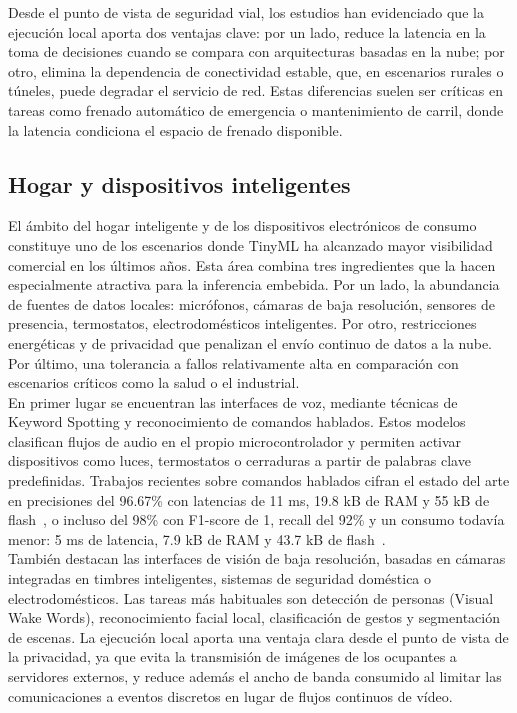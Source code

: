 \documentclass[a4paper,12pt,twoside,final]{book}
\begin{document}
Desde el punto de vista de seguridad vial, los estudios han evidenciado que la ejecución local aporta dos ventajas
clave: por un lado, reduce la latencia en la toma de decisiones cuando se compara con arquitecturas basadas en la
nube; por otro, elimina la dependencia de conectividad estable, que, en escenarios rurales o túneles, puede degradar
el servicio de red. Estas diferencias suelen ser críticas en tareas como frenado automático de emergencia
o mantenimiento de carril, donde la latencia condiciona el espacio de frenado disponible.

\subsection{Hogar y dispositivos inteligentes}
El ámbito del hogar inteligente y de los dispositivos electrónicos de consumo constituye uno de los escenarios donde
TinyML ha alcanzado mayor visibilidad comercial en los últimos años. Esta área combina tres ingredientes que la
hacen especialmente atractiva para la inferencia embebida. Por un lado, la abundancia de fuentes de datos locales:
micrófonos, cámaras de baja resolución, sensores de presencia, termostatos, electrodomésticos inteligentes. Por
otro, restricciones energéticas y de privacidad que penalizan el envío continuo de datos a la nube. Por último,
una tolerancia a fallos relativamente alta en comparación con escenarios críticos como la salud o el industrial.\\

En primer lugar se encuentran las interfaces de voz, mediante técnicas de Keyword Spotting y reconocimiento de
comandos hablados. Estos modelos clasifican flujos de audio en el propio microcontrolador y permiten activar
dispositivos como luces, termostatos o cerraduras a partir de palabras clave predefinidas. Trabajos recientes sobre
comandos hablados cifran el estado del arte en precisiones del 96.67\% con latencias de 11 ms, 19.8 kB de RAM y 55 kB
de flash~\cite{malche2025discoveriot}, o incluso del 98\% con F1-score de 1, recall del 92\% y un consumo todavía
menor: 5 ms de latencia, 7.9 kB de RAM y 43.7 kB de flash~\cite{mishra2024engproc}.\\

También destacan las interfaces de visión de baja resolución, basadas en cámaras integradas en timbres
inteligentes, sistemas de seguridad doméstica o electrodomésticos. Las tareas más habituales son detección de
personas (Visual Wake Words), reconocimiento facial local, clasificación de gestos y segmentación de escenas. La
ejecución local aporta una ventaja clara desde el punto de vista de la privacidad, ya que evita la transmisión de
imágenes de los ocupantes a servidores externos, y reduce además el ancho de banda consumido al limitar las
comunicaciones a eventos discretos en lugar de flujos continuos de vídeo.\\
\end{document}
